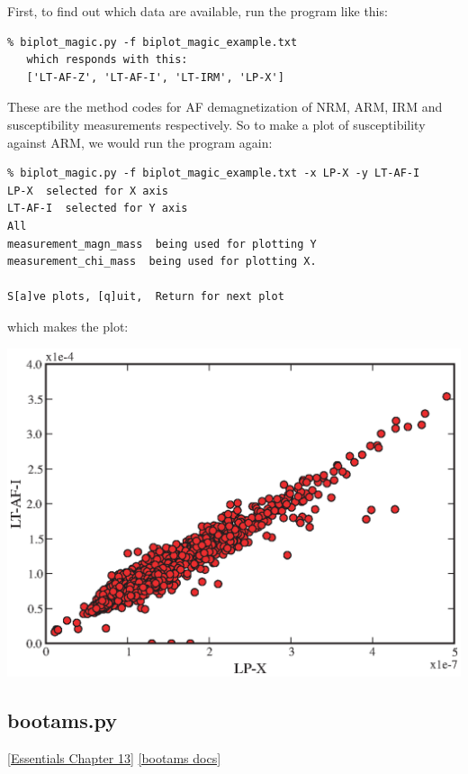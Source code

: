 \documentclass[11pt]{book}
\begin{document}
{{{First, to find out which data are available, run the program like this: 

\begin{verbatim}
% biplot_magic.py -f biplot_magic_example.txt
   which responds with this:
   ['LT-AF-Z', 'LT-AF-I', 'LT-IRM', 'LP-X']
   \end{verbatim}

These are the method codes for  AF demagnetization of NRM, ARM, IRM and susceptibility measurements respectively.  So to make a plot of 
susceptibility against ARM, we would run the program again:


\begin{verbatim}
% biplot_magic.py -f biplot_magic_example.txt -x LP-X -y LT-AF-I
LP-X  selected for X axis
LT-AF-I  selected for Y axis
All
measurement_magn_mass  being used for plotting Y
measurement_chi_mass  being used for plotting X.

S[a]ve plots, [q]uit,  Return for next plot 
\end{verbatim}

\noindent which makes the plot:

  \includegraphics[width=15cm]{EPSfiles/arm-x.eps}
  
  
\subsection{bootams.py} 
\href{http://magician.ucsd.edu/Essentials_2/WebBook2ch13.html#ch13}{[Essentials Chapter 13]}
\href{http://earthref.org/PmagPy/pmagpydocs/bootams-module.html}{[bootams docs]}

}}}
\end{document}
